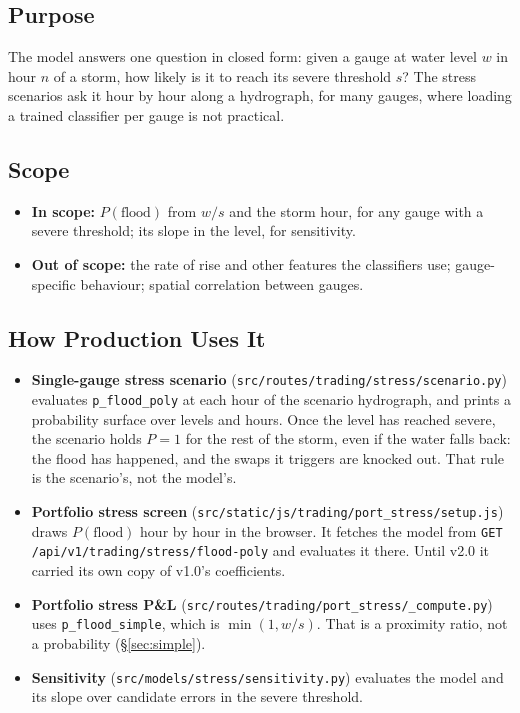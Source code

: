 \documentclass[11pt,a4paper]{article}
\begin{document}
\mkmpurpose

\subsection{Purpose}
The model answers one question in closed form: given a gauge at water level $w$ in
hour $n$ of a storm, how likely is it to reach its severe threshold $s$? The stress
scenarios ask it hour by hour along a hydrograph, for many gauges, where loading a
trained classifier per gauge is not practical.

\subsection{Scope}
\begin{itemize}[nosep]
    \item \textbf{In scope:} $P(\text{flood})$ from $w/s$ and the storm hour, for any
          gauge with a severe threshold; its slope in the level, for sensitivity.
    \item \textbf{Out of scope:} the rate of rise and other features the classifiers
          use; gauge-specific behaviour; spatial correlation between gauges.
\end{itemize}

\subsection{How Production Uses It}
\begin{itemize}[nosep]
    \item \textbf{Single-gauge stress scenario}
          (\texttt{src/routes/trading/stress/scenario.py}) evaluates
          \texttt{p\_flood\_poly} at each hour of the scenario hydrograph, and prints a
          probability surface over levels and hours. Once the level has reached
          severe, the scenario holds $P=1$ for the rest of the storm, even if the water
          falls back: the flood has happened, and the swaps it triggers are knocked
          out. That rule is the scenario's, not the model's.
    \item \textbf{Portfolio stress screen}
          (\texttt{src/static/js/trading/port\_stress/setup.js}) draws $P(\text{flood})$
          hour by hour in the browser. It fetches the model from
          \texttt{GET /api/v1/trading/stress/flood-poly} and evaluates it there. Until
          v2.0 it carried its own copy of v1.0's coefficients.
    \item \textbf{Portfolio stress P\&L}
          (\texttt{src/routes/trading/port\_stress/\_compute.py}) uses
          \texttt{p\_flood\_simple}, which is $\min(1, w/s)$. That is a proximity ratio,
          not a probability (\S\ref{sec:simple}).
    \item \textbf{Sensitivity} (\texttt{src/models/stress/sensitivity.py}) evaluates
          the model and its slope over candidate errors in the severe threshold.
\end{itemize}
\end{document}
